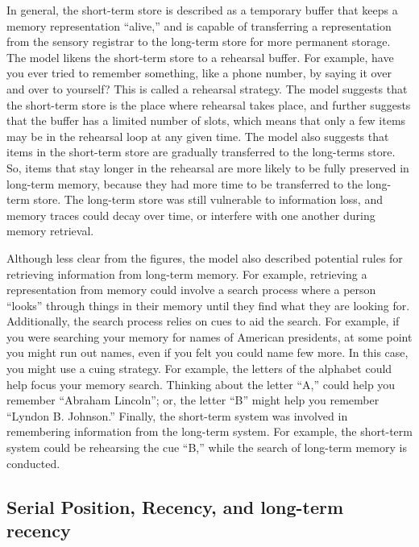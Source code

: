 \documentclass[
  oneside,
  12pt]{crumpbook}
\begin{document}
In general, the short-term store is described as a temporary buffer that keeps a memory representation ``alive,'' and is capable of transferring a representation from the sensory registrar to the long-term store for more permanent storage. The model likens the short-term store to a rehearsal buffer. For example, have you ever tried to remember something, like a phone number, by saying it over and over to yourself? This is called a rehearsal strategy. The model suggests that the short-term store is the place where rehearsal takes place, and further suggests that the buffer has a limited number of slots, which means that only a few items may be in the rehearsal loop at any given time. The model also suggests that items in the short-term store are gradually transferred to the long-terms store. So, items that stay longer in the rehearsal are more likely to be fully preserved in long-term memory, because they had more time to be transferred to the long-term store. The long-term store was still vulnerable to information loss, and memory traces could decay over time, or interfere with one another during memory retrieval.

Although less clear from the figures, the model also described potential rules for retrieving information from long-term memory. For example, retrieving a representation from memory could involve a search process where a person ``looks'' through things in their memory until they find what they are looking for. Additionally, the search process relies on cues to aid the search. For example, if you were searching your memory for names of American presidents, at some point you might run out names, even if you felt you could name few more. In this case, you might use a cuing strategy. For example, the letters of the alphabet could help focus your memory search. Thinking about the letter ``A,'' could help you remember ``Abraham Lincoln''; or, the letter ``B'' might help you remember ``Lyndon B. Johnson.'' Finally, the short-term system was involved in remembering information from the long-term system. For example, the short-term system could be rehearsing the cue ``B,'' while the search of long-term memory is conducted.

\hypertarget{serial-position-recency-and-long-term-recency}{%
\subsection{Serial Position, Recency, and long-term recency}\label{serial-position-recency-and-long-term-recency}}
\end{document}
